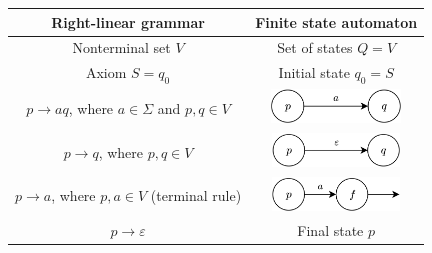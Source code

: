 \begin{table}[H]
    \centering
    \begin{tabular}{cc}
    \hline
    \textbf{Right-linear grammar}                            & \textbf{Finite state automaton} \\ \hline
    Nonterminal set $V$                                      & Set of states $Q=V$             \\
    Axiom $S=q_0$                                            & Initial state $q_0=S$           \\
    $p \rightarrow aq$, where $a \in \Sigma$ and $p,q \in V$ & \begin{minipage}{.2\textwidth}\centering\includegraphics[width=\linewidth, height=9mm]{images/a.png}\end{minipage}                                \\
    $p \rightarrow q$, where $p,q \in V$                     & \begin{minipage}{.2\textwidth}\centering\includegraphics[width=\linewidth, height=9mm]{images/b.png}\end{minipage}                                 \\
    $p \rightarrow a$, where $p,a \in V$ (terminal rule)     & \begin{minipage}{.2\textwidth}\centering\includegraphics[width=\linewidth, height=9mm]{images/c.png}\end{minipage}                                 \\
    $p \rightarrow \varepsilon$                              & Final state $p$                 \\ \hline
    \end{tabular}
\end{table}
